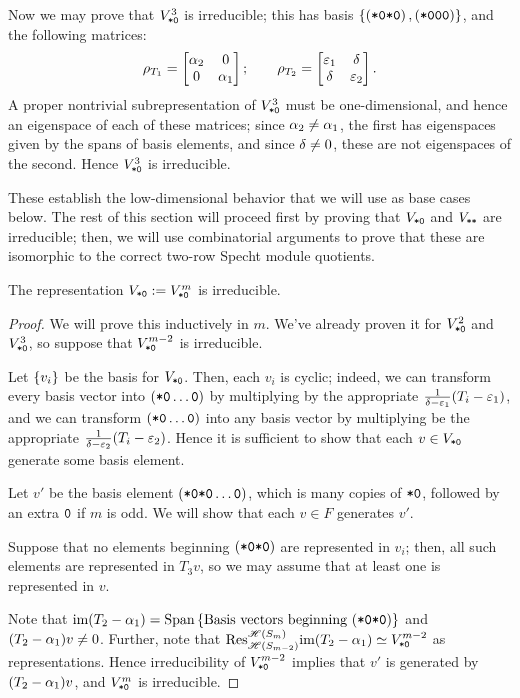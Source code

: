 \documentclass{amsart}
\begin{document}
Now we may prove that $V^3_{\texttt{*}\texttt{0}}$ is irreducible;
this has basis $\left\{ \left( \texttt{*}\texttt{0}\texttt{*}\texttt{0} \right), \left( \texttt{*}\texttt{0}\texttt{0}\texttt{0} \right) \right\}$, and the following matrices:
\[
  \rho_{T_1} = \begin{bmatrix}
    \alpha_2 & 0\\
    0 & \alpha_1
  \end{bmatrix}; \hspace{20pt}
  \rho_{T_2} = \begin{bmatrix}
    \varepsilon_1 & \delta\\
    \delta & \varepsilon_2
  \end{bmatrix}.
\]
A proper nontrivial subrepresentation of $V_{\texttt{*}\texttt{0}}^3$ must be one-dimensional, and hence an eigenspace of each of these matrices;
since $\alpha_2 \neq \alpha_1$, the first has eigenspaces given by the spans of basis elements, and since $\delta \neq 0$, these are not eigenspaces of the second.
Hence $V^3_{\texttt{*}\texttt{0}}$ is irreducible.

These establish the low-dimensional behavior that we will use as base cases below.
The rest of this section will proceed first by proving that $V_{\texttt{*}\texttt{0}}$ and $V_{\texttt{*}\texttt{*}}$ are irreducible;
then, we will use combinatorial arguments to prove that these are isomorphic to the correct two-row Specht module quotients.

\begin{proposition}
  The representation $V_{\texttt{*}\texttt{0}} := V^m_{\texttt{*}\texttt{0}}$ is irreducible.
\end{proposition}
\begin{proof}
  We will prove this inductively in $m$.
  We've already proven it for $V^2_{\texttt{*}\texttt{0}}$ and $V^3_{\texttt{*}\texttt{0}}$, so suppose that $V^{m-2}_{\texttt{*}\texttt{0}}$ is irreducible.
  
  Let $\left\{ v_i \right\}$ be the basis for $V_{\texttt{*}\texttt{0}}$.
  Then, each $v_i$ is cyclic; indeed, we can transform every basis vector into $(\texttt{*}\texttt{0} \dots \texttt{0})$ by multiplying by the appropriate $\frac{1}{\delta-\varepsilon_1}(T_i - \varepsilon_1)$, and we can transform $(\texttt{*}\texttt{0} \dots \texttt{0})$ into any basis vector by multiplying be the appropriate $\frac{1}{\delta-\varepsilon_2}(T_i - \varepsilon_2)$.
  Hence it is sufficient to show that each $v \in V_{\texttt{*}\texttt{0}}$ generate some basis element.

  Let $v'$ be the basis element $(\texttt{*}\texttt{0}\texttt{*}\texttt{0}\dots \texttt{0})$, which is many copies of $\texttt{*}\texttt{0}$, followed by an extra $\texttt{0}$ if $m$ is odd.
  We will show that each $v \in F$ generates $v'$.

  Suppose that no elements beginning $(\texttt{*}\texttt{0}\texttt{*}\texttt{0})$ are represented in $v_i$;
  then, all such elements are represented in $T_3v$, so we may assume that at least one is represented in $v$.

  Note that $\text{im} (T_2 - \alpha_1) = \text{Span}\left\{ \text{Basis vectors beginning }(\texttt{*}\texttt{0}\texttt{*}\texttt{0}) \right\}$ and $(T_2 - \alpha_1)v \neq 0$.
  Further, note that $\text{Res}_{\mathscr{H}(S_{m-2})}^{\mathscr{H}(S_m)} \text{im} (T_2 - \alpha_1) \simeq V^{m-2}_{\texttt{*}\texttt{0}}$ as representations.
  Hence irreducibility of $V^{m-2}_{\texttt{*}\texttt{0}}$ implies that $v'$ is generated by $(T_2 - \alpha_1)v$, and $V^m_{\texttt{*}\texttt{0}}$ is irreducible.
\end{proof}
\end{document}
